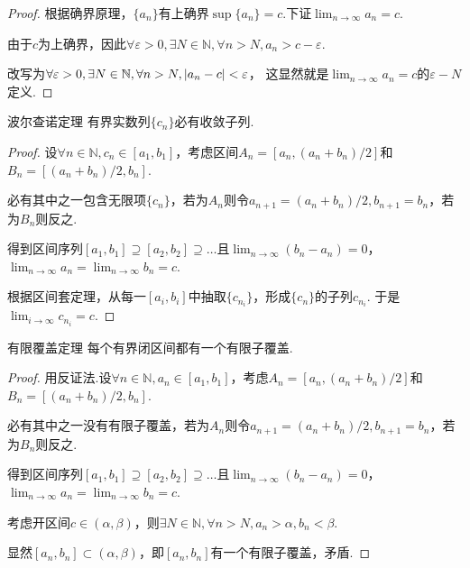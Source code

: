 \begin{proof}
    根据确界原理，\(\{a_n\}\)有上确界\(\sup\{a_n\}=c\).下证\(\lim_{n \to \infty}a_n=c\).

    由于\(c\)为上确界，因此\(\forall \varepsilon>0, \exists N \in \mathbb{N}, \forall n>N, a_n>c-\varepsilon\).

    改写为\(\forall \varepsilon>0, \exists N \in \mathbb{N}, \forall n>N, \abs*{a_n-c}<\varepsilon\)，
    这显然就是\(\lim_{n \to \infty}a_n=c\)的\(\varepsilon-N\)定义.
\end{proof}

\begin{theorem}\label{1.A.5} 波尔查诺定理 \:
    有界实数列\(\{c_n\}\)必有收敛子列.
\end{theorem}

\begin{proof}
    设\(\forall n \in \mathbb{N}, c_n \in [a_1,b_1]\)，考虑区间\(A_n=[a_n,(a_n+b_n)/2]\)和\(B_n=[(a_n+b_n)/2,b_n]\).

    必有其中之一包含无限项\(\{c_n\}\)，若为\(A_n\)则令\(a_{n+1}=(a_n+b_n)/2, b_{n+1}=b_n\)，若为\(B_n\)则反之.

    得到区间序列\([a_1,b_1] \supseteq [a_2,b_2] \supseteq \dots\)且\(\lim_{n \to \infty}(b_n-a_n)=0\)，
    \(\lim_{n \to \infty}a_n=\lim_{n \to \infty}b_n=c\).

    根据区间套定理，从每一\([a_i,b_i]\)中抽取\(\{c_{n_i}\}\)，形成\(\{c_n\}\)的子列\(c_{n_i}\).
    于是\(\lim_{i \to \infty}c_{n_i}=c\).
\end{proof}

\begin{theorem}\label{1.A.6} 有限覆盖定理 \:
    每个有界闭区间都有一个有限子覆盖.
\end{theorem}

\begin{proof}
    用反证法.设\(\forall n \in \mathbb{N}, a_n \in [a_1,b_1]\)，考虑\(A_n=[a_n,(a_n+b_n)/2]\)和\(B_n=[(a_n+b_n)/2,b_n]\).

    必有其中之一没有有限子覆盖，若为\(A_n\)则令\(a_{n+1}=(a_n+b_n)/2, b_{n+1}=b_n\)，若为\(B_n\)则反之.

    得到区间序列\([a_1,b_1] \supseteq [a_2,b_2] \supseteq \dots\)且\(\lim_{n \to \infty}(b_n-a_n)=0\)，
    \(\lim_{n \to \infty}a_n=\lim_{n \to \infty}b_n=c\).

    考虑开区间\(c \in (\alpha,\beta)\)，则\(\exists N \in \mathbb{N}, \forall n>N, a_n>\alpha, b_n<\beta\).

    显然\([a_n,b_n] \subset (\alpha,\beta)\)，即\([a_n,b_n]\)有一个有限子覆盖，矛盾.
\end{proof}